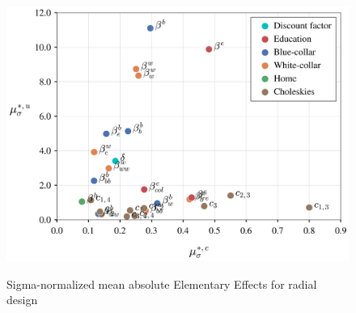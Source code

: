 \documentclass[a4paper,12pt]{article}
\begin{document}
\begin{figure}[H]
	\caption{Sigma-normalized mean absolute Elementary Effects for radial design}
	\centering
	\includegraphics[scale=0.52]{../../../scrypy/figures/scatter_rad}
	\label{fig:rad}
\end{figure}


\newpage
\end{document}
